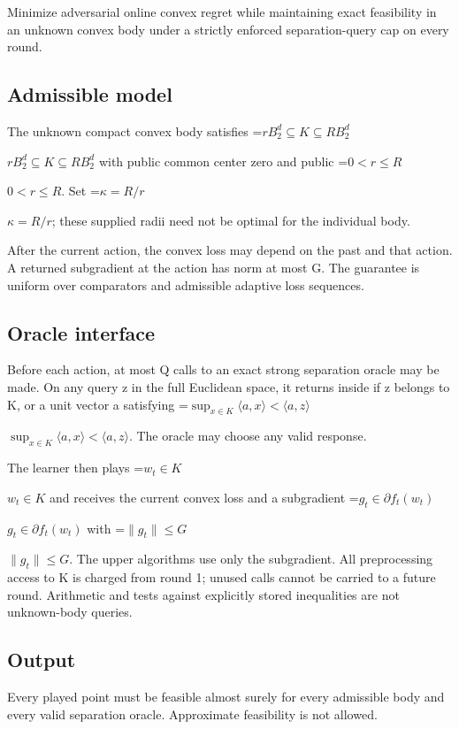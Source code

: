 \documentclass[10pt,a4paper]{article}
\newcommand{\AtlasMath}[1]{\par\begingroup\centering\setbox0=\hbox{$\displaystyle #1$}\ifdim\wd0>1.4\linewidth\typeout{ATLAS WIDE FORMULA: \the\wd0}\fi\ifdim\wd0>\linewidth\resizebox{\linewidth}{!}{\box0}\else\box0\fi\par\endgroup}
\newcommand{\AtlasInlineMath}[1]{\begingroup\setbox0=\hbox{$#1$}\ifdim\wd0>.4\linewidth\endgroup\AtlasMath{#1}\else\endgroup$#1$\fi}
\begin{document}
Minimize adversarial online convex regret while maintaining exact feasibility in an unknown convex body under a strictly enforced separation-query cap on every round.



\subsection{Admissible model}


The unknown compact convex body satisfies \AtlasInlineMath{rB_2^d\subseteq K\subseteq RB_2^d} with public common center zero and public \AtlasInlineMath{0<r\le R}. Set \AtlasInlineMath{\kappa=R/r}; these supplied radii need not be optimal for the individual body.



After the current action, the convex loss may depend on the past and that action. A returned subgradient at the action has norm at most G. The guarantee is uniform over comparators and admissible adaptive loss sequences.



\subsection{Oracle interface}


Before each action, at most Q calls to an exact strong separation oracle may be made. On any query z in the full Euclidean space, it returns inside if z belongs to K, or a unit vector a satisfying \AtlasInlineMath{\sup_{x\in K}\langle a,x\rangle<\langle a,z\rangle}. The oracle may choose any valid response.



The learner then plays \AtlasInlineMath{w_t\in K} and receives the current convex loss and a subgradient \AtlasInlineMath{g_t\in\partial f_t(w_t)} with \AtlasInlineMath{\|g_t\|\le G}. The upper algorithms use only the subgradient. All preprocessing access to K is charged from round 1; unused calls cannot be carried to a future round. Arithmetic and tests against explicitly stored inequalities are not unknown-body queries.



\subsection{Output}


Every played point must be feasible almost surely for every admissible body and every valid separation oracle. Approximate feasibility is not allowed.
\end{document}
